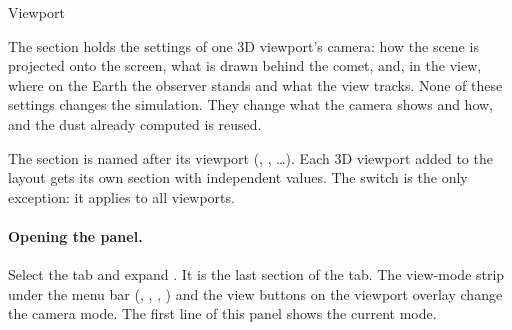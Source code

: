 \begin{uipanel}[key=settings-viewport,
    open={\menu{Settings > Viewport 1} (one section per 3D viewport; the default layout has one)},
    modes={all three views; parts of the panel change with the view (Table~\ref{tab:viewport-modes})}]
  {Viewport}

The  section holds the settings of one 3D viewport's camera: how the scene is
projected onto the screen, what is drawn behind the comet, and, in the  view, where
on the Earth the observer stands and what the view tracks. None of these settings changes the
simulation. They change what the camera shows and how, and the dust already computed is
reused.

The section is named after its viewport (, , \dots).
Each 3D viewport added to the layout gets its own section with independent values. The
 switch is the only exception: it applies to all viewports.

\paragraph{Opening the panel.} Select the  tab and expand
. It is the last section of the tab. The view-mode strip under the menu bar
(, , , ) and the view buttons on
the viewport overlay change the camera mode. The first line of this panel shows the current
mode.


\end{uipanel}
